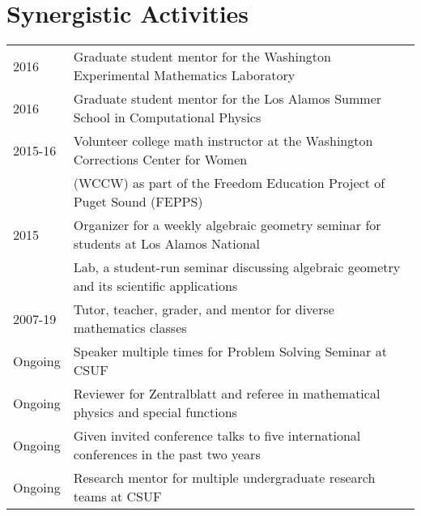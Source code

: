 \documentclass[11pt,letterpaper]{article}
\theoremstyle{definition}
\begin{document}
\section{Synergistic Activities}
\begin{tabular}{ll}
2016& Graduate student mentor for the Washington Experimental Mathematics Laboratory\\
2016&Graduate student mentor for the Los Alamos Summer School in Computational Physics\\
2015-16& Volunteer college math instructor at the Washington Corrections Center for Women\\
 &(WCCW) as part of the Freedom Education Project of Puget Sound (FEPPS)\\
2015&Organizer for a weekly algebraic geometry seminar for students at Los Alamos National\\
 & Lab, a student-run seminar discussing algebraic geometry and its scientific applications\\
2007-19 & Tutor, teacher, grader, and mentor for diverse mathematics classes\\
Ongoing & Speaker multiple times for Problem Solving Seminar at CSUF\\
Ongoing & Reviewer for Zentralblatt and referee in mathematical physics and special functions\\
Ongoing & Given invited conference talks to five international conferences in the past two years\\
Ongoing & Research mentor for multiple undergraduate research teams at CSUF
\end{tabular}
\end{document}
